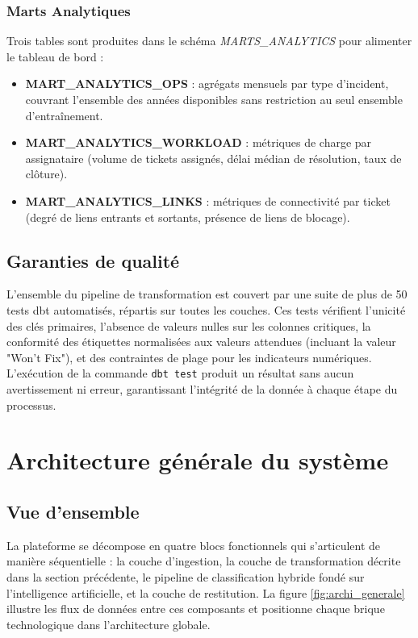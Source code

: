 \subsubsection{Marts Analytiques}

Trois tables sont produites dans le schéma \textit{MARTS\_ANALYTICS} pour alimenter le tableau de bord :

\begin{itemize}
    \item \textbf{MART\_ANALYTICS\_OPS} : agrégats mensuels par type d'incident, couvrant l'ensemble des années disponibles sans restriction au seul ensemble d'entraînement.
    \item \textbf{MART\_ANALYTICS\_WORKLOAD} : métriques de charge par assignataire (volume de tickets assignés, délai médian de résolution, taux de clôture).
    \item \textbf{MART\_ANALYTICS\_LINKS} : métriques de connectivité par ticket (degré de liens entrants et sortants, présence de liens de blocage).
\end{itemize}

\subsection{Garanties de qualité}

L'ensemble du pipeline de transformation est couvert par une suite de plus de 50 tests dbt automatisés, répartis sur toutes les couches. Ces tests vérifient l'unicité des clés primaires, l'absence de valeurs nulles sur les colonnes critiques, la conformité des étiquettes normalisées aux valeurs attendues (incluant la valeur "Won't Fix"), et des contraintes de plage pour les indicateurs numériques. L'exécution de la commande \texttt{dbt test} produit un résultat sans aucun avertissement ni erreur, garantissant l'intégrité de la donnée à chaque étape du processus.

\section{Architecture générale du système}

\subsection{Vue d'ensemble}

La plateforme se décompose en quatre blocs fonctionnels qui s'articulent de manière séquentielle : la couche d'ingestion, la couche de transformation décrite dans la section précédente, le pipeline de classification hybride fondé sur l'intelligence artificielle, et la couche de restitution. La figure \ref{fig:archi_generale} illustre les flux de données entre ces composants et positionne chaque brique technologique dans l'architecture globale.

